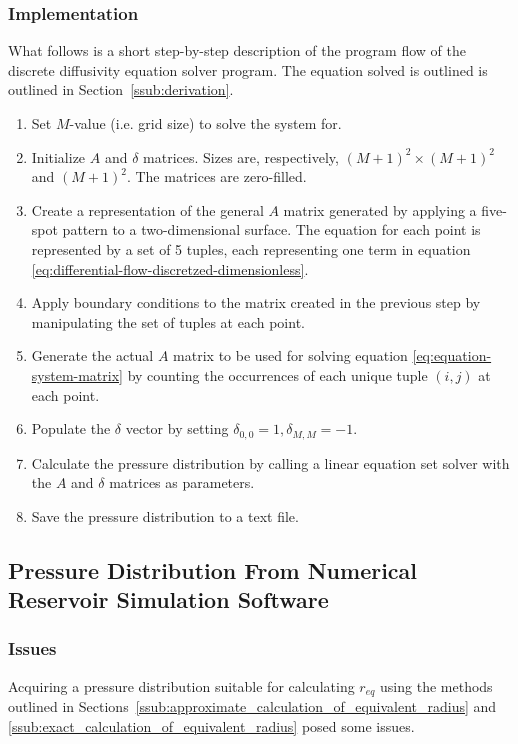 \subsubsection{Implementation} %
\label{ssub:implementation}
What follows is a short step-by-step description of the program flow of the discrete diffusivity equation solver program. The equation solved is outlined is outlined in Section~\ref{ssub:derivation}.
\begin{enumerate}
    \item Set $M$-value (i.e. grid size) to solve the system for.
    \item Initialize $A$ and $\delta$ matrices. Sizes are, respectively, $(M+1)^2 \times (M+1)^2$ and $(M+1)^2$. The matrices are zero-filled.
    \item Create a representation of the general $A$ matrix generated by applying a five-spot pattern to a two-dimensional surface. The equation for each point is represented by a set of 5 tuples, each representing one term in equation \eqref{eq:differential-flow-discretzed-dimensionless}.
    \item Apply boundary conditions to the matrix created in the previous step by manipulating the set of tuples at each point.
    \item Generate the actual $A$ matrix to be used for solving equation \eqref{eq:equation-system-matrix} by counting the occurrences of each unique tuple $(i,j)$ at each point.
    \item Populate the $\delta$ vector by setting $\delta_{0,0}=1,\delta_{M,M}=-1$.
    \item Calculate the pressure distribution by calling a linear equation set solver with the $A$ and $\delta$ matrices as parameters.
    \item Save the pressure distribution to a text file.
\end{enumerate}


\subsection{Pressure Distribution From Numerical Reservoir Simulation Software} %
\label{sub:using_pressure_distribution_from_numerical_reservoir_simulation_software}

\subsubsection{Issues} %
\label{ssub:issues_and_approximations}
Acquiring a pressure distribution suitable for calculating $r_{eq}$ using the methods outlined in Sections~\ref{ssub:approximate_calculation_of_equivalent_radius} and \ref{ssub:exact_calculation_of_equivalent_radius} posed some issues.

